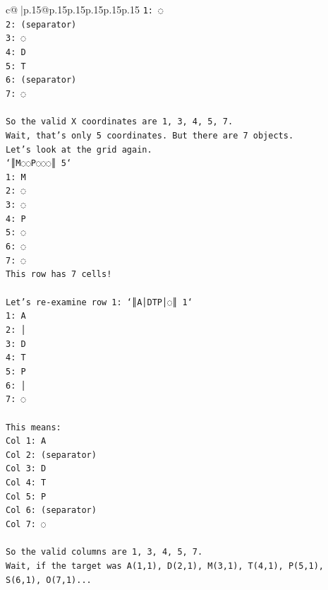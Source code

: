 \documentclass{article}
\begin{document}
{\begin{supertabular}{c@{$\;$}|p{.15\linewidth}@{}p{.15\linewidth}p{.15\linewidth}p{.15\linewidth}p{.15\linewidth}p{.15\linewidth}}
{{{\texttt{1: ◌} \\
\texttt{2: (separator)} \\
\texttt{3: ◌} \\
\texttt{4: D} \\
\texttt{5: T} \\
\texttt{6: (separator)} \\
\texttt{7: ◌} \\
\\ 
\texttt{So the valid X coordinates are 1, 3, 4, 5, 7.} \\
\texttt{Wait, that's only 5 coordinates. But there are 7 objects.} \\
\texttt{Let's look at the grid again.} \\
\texttt{`║M◌◌P◌◌◌║ 5`} \\
\texttt{1: M} \\
\texttt{2: ◌} \\
\texttt{3: ◌} \\
\texttt{4: P} \\
\texttt{5: ◌} \\
\texttt{6: ◌} \\
\texttt{7: ◌} \\
\texttt{This row has 7 cells!} \\
\\ 
\texttt{Let's re{-}examine row 1: `║A│DTP│◌║ 1`} \\
\texttt{1: A} \\
\texttt{2: │} \\
\texttt{3: D} \\
\texttt{4: T} \\
\texttt{5: P} \\
\texttt{6: │} \\
\texttt{7: ◌} \\
\\ 
\texttt{This means:} \\
\texttt{Col 1: A} \\
\texttt{Col 2: (separator)} \\
\texttt{Col 3: D} \\
\texttt{Col 4: T} \\
\texttt{Col 5: P} \\
\texttt{Col 6: (separator)} \\
\texttt{Col 7: ◌} \\
\\ 
\texttt{So the valid columns are 1, 3, 4, 5, 7.} \\
\texttt{Wait, if the target was A(1,1), D(2,1), M(3,1), T(4,1), P(5,1), S(6,1), O(7,1)...} \\
}}}
\end{supertabular}}
\end{document}

